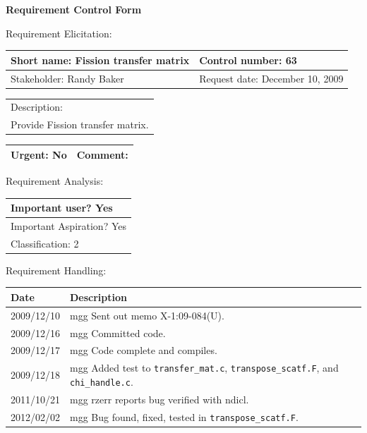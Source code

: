 \begin{center}\Large\bf
Requirement Control Form
\end{center}
\vspace{24pt}

Requirement Elicitation:

\begin{tabular}{|p{211pt}|p{211pt}|} \hline
Short name: Fission transfer matrix & Control number: 63\\ \hline
Stakeholder: Randy Baker & Request date: December 10, 2009\\
\end{tabular}
\begin{tabular}{|p{433pt}|} \hline
Description: \\ 
Provide Fission transfer matrix.
\\ \hline
\end{tabular} 
\begin{tabular}{|p{211pt}|p{211pt}|} \hline
Urgent: No & Comment: 
\\ \hline
\end{tabular}

\vspace{24pt}

Requirement Analysis:

\begin{tabular}{|p{433pt}|} \hline
Important user? Yes \\ \hline
Important Aspiration? Yes \\ \hline
Classification: 2 \\ \hline
\end{tabular}
\vspace{24pt}

Requirement Handling:

\begin{tabular}{|p{72pt}|p{351pt}|} \hline
Date & Description \\ \hline
2009/12/10 & mgg Sent out memo X-1:09-084(U). \\ \hline 
2009/12/16 & mgg Committed code. \\ \hline 
2009/12/17 & mgg Code complete and compiles. \\ \hline
2009/12/18 & mgg Added test to \texttt{transfer\_mat.c},
\texttt{transpose\_scatf.F}, and \texttt{chi\_handle.c}. \\ \hline 
2011/10/21 & mgg rzerr reports bug verified with ndicl. \\ \hline
2012/02/02 & mgg Bug found, fixed, tested in
\texttt{transpose\_scatf.F}. \\ \hline 
\end{tabular}
